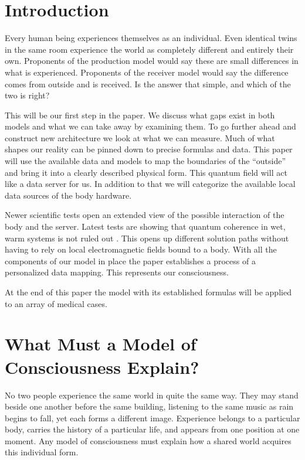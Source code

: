 \section{Introduction}

Every human being experiences themselves as an individual. Even identical twins in
the same room experience the world as completely different and entirely their own.
Proponents of the production model would say these are small differences in what is
experienced. Proponents of the receiver model would say the difference comes from
outside and is received. Is the answer that simple, and which of the two is right?

This will be our first step in the paper. We discuss what gaps exist in both models
and what we can take away by examining them. To go further ahead and construct new
architecture we look at what we can measure. Much of what shapes our reality can be
pinned down to precise formulas and data. This paper will use the available data and
models to map the boundaries of the ``outside'' and bring it into a clearly described
physical form. This quantum field will act like a data server for us. In addition to
that we will categorize the available local data sources of the body hardware.

Newer scientific tests open an extended view of the possible interaction of the body
and the server. Latest tests are showing that quantum coherence in wet, warm systems
is not ruled out \citep{babcock2024, kalra2023}. This opens up different solution paths without having to rely on
local electromagnetic fields bound to a body. With all the components of our model in
place the paper establishes a process of a personalized data mapping. This represents
our consciousness.

At the end of this paper the model with its established formulas will be applied to
an array of medical cases.

\section{What Must a Model of Consciousness Explain?}
\label{sec:existing_models}

No two people experience the same world in quite the same way. They may stand beside
one another before the same building, listening to the same music as rain begins to
fall, yet each forms a different image. Experience belongs to a particular body,
carries the history of a particular life, and appears from one position at one moment.
Any model of consciousness must explain how a shared world acquires this individual
form.

